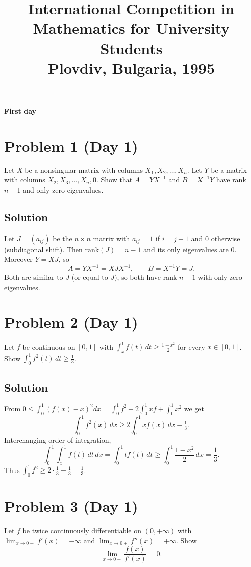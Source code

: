 \documentclass{article}
\title{International Competition in Mathematics for University Students\\
Plovdiv, Bulgaria, 1995}
\date{}
\begin{document}
\maketitle

\begin{center}\textbf{First day}\end{center}

\section*{Problem 1 (Day 1)}
Let $X$ be a nonsingular matrix with columns $X_1, X_2, \ldots, X_n$. Let $Y$ be a matrix with columns $X_2, X_3, \ldots, X_n, 0$. Show that $A = YX^{-1}$ and $B = X^{-1}Y$ have rank $n-1$ and only zero eigenvalues.

\subsection*{Solution}
Let $J = (a_{ij})$ be the $n\times n$ matrix with $a_{ij} = 1$ if $i = j+1$ and $0$ otherwise (subdiagonal shift). Then $\mathrm{rank}(J) = n-1$ and its only eigenvalues are $0$. Moreover $Y = XJ$, so
\[
A = YX^{-1} = XJX^{-1}, \qquad B = X^{-1}Y = J.
\]
Both are similar to $J$ (or equal to $J$), so both have rank $n-1$ with only zero eigenvalues.

\section*{Problem 2 (Day 1)}
Let $f$ be continuous on $[0,1]$ with $\int_x^1 f(t)\,dt \geq \frac{1-x^2}{2}$ for every $x \in [0,1]$. Show $\int_0^1 f^2(t)\,dt \geq \frac{1}{3}$.

\subsection*{Solution}
From $0 \leq \int_0^1 (f(x) - x)^2 dx = \int_0^1 f^2 - 2\int_0^1 xf + \int_0^1 x^2$ we get
\[
\int_0^1 f^2(x)\,dx \geq 2\int_0^1 xf(x)\,dx - \tfrac{1}{3}.
\]
Interchanging order of integration,
\[
\int_0^1\!\int_x^1 f(t)\,dt\,dx = \int_0^1 t f(t)\,dt \geq \int_0^1 \frac{1-x^2}{2}\,dx = \frac{1}{3}.
\]
Thus $\int_0^1 f^2 \geq 2 \cdot \tfrac{1}{3} - \tfrac{1}{3} = \tfrac{1}{3}$.

\section*{Problem 3 (Day 1)}
Let $f$ be twice continuously differentiable on $(0, +\infty)$ with $\lim_{x\to 0+} f'(x) = -\infty$ and $\lim_{x\to 0+} f''(x) = +\infty$. Show
\[
\lim_{x\to 0+} \frac{f(x)}{f'(x)} = 0.
\]
\end{document}
